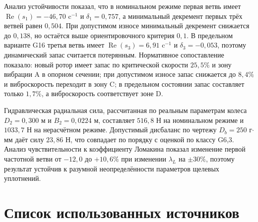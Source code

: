 \documentclass[14pt,a4paper]{extarticle}
\numberwithin{equation}{section}
\numberwithin{figure}{section}
\numberwithin{table}{section}
\begin{document}
Анализ устойчивости показал, что в номинальном режиме первая ветвь имеет $\operatorname{Re}(s_1)=-46{,}70$ c$^{-1}$ и $\delta_1=0{,}757$, а минимальный декремент первых трёх ветвей равен $0{,}504$. При допустимом износе минимальный декремент снижается до $0{,}138$, но остаётся выше ориентировочного критерия $0{,}1$. В предельном варианте G16 третья ветвь имеет $\operatorname{Re}(s_3)=6{,}91$ c$^{-1}$ и $\delta_3=-0{,}053$, поэтому динамический запас считается потерянным. Нормативное сопоставление показало: новый ротор имеет запас по критической скорости $25{,}5\%$ и зону вибрации A в опорном сечении; при допустимом износе запас снижается до $8{,}4\%$ и виброскорость переходит в зону C; в предельном состоянии запас составляет только $1{,}7\%$, а виброскорость соответствует зоне D.

Гидравлическая радиальная сила, рассчитанная по реальным параметрам колеса $D_2=0{,}300$ м и $B_2=0{,}0224$ м, составляет $516{,}8$ Н на номинальном режиме и $1033{,}7$ Н на нерасчётном режиме. Допустимый дисбаланс по чертежу $D_b=250$ г$\cdot$мм даёт силу $23{,}86$ Н, что совпадает по порядку с оценкой по классу G6,3. Анализ чувствительности к коэффициенту Ломакина показал изменение первой частотной ветви от $-12{,}0$ до $+10{,}6\%$ при изменении $\lambda_L$ на $\pm30\%$, поэтому результат устойчив к разумной неопределённости параметров щелевых уплотнений.

\newpage
\section*{Список использованных источников}
\end{document}
